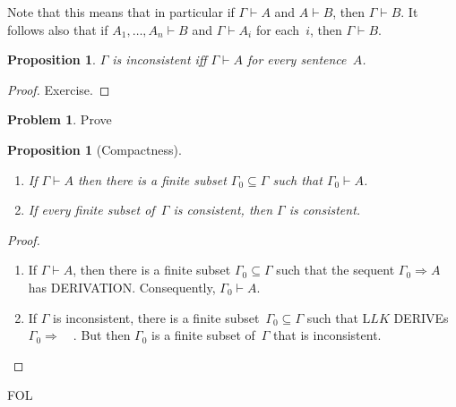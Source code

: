 \documentclass[10pt,a4paper]{article}
\makeatletter
\newcommand*{\olup}[1]{\MakeUppercase{#1}}
\theoremstyle{plain}
\newtheorem{prop}[thm]{Proposition}
\theoremstyle{definition}
\newtheorem{prob}{Problem}[section]
\theoremstyle{remark}
\newcommand*{\olfileid}[3]{}
\newcommand*{\ollabel}[1]{\label{#1}}
\newcommand{\olref}{\@ifnextchar[{\olref@i}{\olref@final}}
\def\olref@i[#1]{\@ifnextchar[{\olref@ii}{\olref@final}}
\def\olref@ii[#1]{\@ifnextchar[{\olref@iii}{\olref@final}}
\def\olref@iii[#1]{\olref@final}
\def\olref@final#1{\ref{#1}}
\providecommand{\Sequent}{\mathrel{\Rightarrow}}
\providecommand{\Proves}{\mathrel{\vdash}}
\providecommand{\Log}{\ensuremath{\mathrm{L}}}
\providecommand{\iftag}[1]{#1}
\providecommand{\iftag}{}
\makeatother
\begin{document}
Note that this means that in particular if $\Gamma \Proves A$ and $A
\Proves B$, then $\Gamma \Proves B$. It follows also that if $A_1,
\dots, A_n \Proves B$ and $\Gamma \Proves A_i$ for each~$i$, then
$\Gamma \Proves B$.

\begin{prop}
\ollabel{prop:incons}
$\Gamma$ is inconsistent iff $\Gamma \Proves {A}$ for every
  sentence~$A$.
\end{prop}

\begin{proof}
Exercise.
\end{proof}

\begin{prob}
Prove \olref[fol][seq][ptn]{prop:incons}
\end{prob}

\begin{prop}[Compactness]
  \ollabel{prop:proves-compact}
  \begin{enumerate}
  \item If $\Gamma \Proves A$ then there is a finite subset $\Gamma_0
    \subseteq \Gamma$ such that $\Gamma_0 \Proves A$.
  \item If every finite subset of~$\Gamma$ is
    consistent, then $\Gamma$ is consistent.
  \end{enumerate}
\end{prop}

\begin{proof}
  \begin{enumerate}
    \item If $\Gamma \Proves A$, then there is a finite subset
      $\Gamma_0 \subseteq \Gamma$ such that the sequent $\Gamma_0
      \Sequent A$ has \olup{derivation}. Consequently, $\Gamma_0
      \Proves A$.
    \item If $\Gamma$ is inconsistent, there is a finite
      subset~$\Gamma_0 \subseteq \Gamma$ such that $\Log{LK}$
      \olup{derive}s $\Gamma_0 \Sequent \quad$. But then $\Gamma_0$ is a
      finite subset of~$\Gamma$ that is inconsistent.
  \end{enumerate}
\end{proof}





\iftag{FOL}
      {\olfileid{fol}{seq}{prl}}
      {\olfileid{pl}{seq}{prl}}
\end{document}
